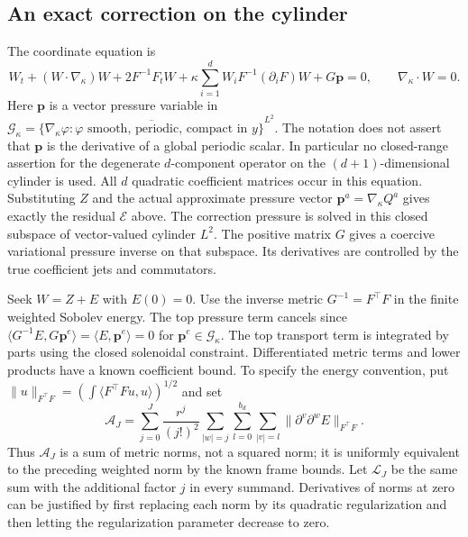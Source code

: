 \subsection{An exact correction on the cylinder}
The coordinate equation is
\begin{equation}\label{eq:packet-coordinate-equation}
 W_t+(W\cdot\nabla_\kappa)W+2F^{-1}F_tW
    +\kappa\sum_{i=1}^d W_iF^{-1}(\partial_iF)W
    +G\mathbf p=0,
 \qquad \nabla_\kappa\cdot W=0.
\end{equation}
Here $\mathbf p$ is a vector pressure variable in
$\mathscr G_\kappa=\overline{\{\nabla_\kappa\varphi:
\varphi\text{ smooth, periodic, compact in }y\}}^{L^2}$.
The notation does not assert that $\mathbf p$ is the derivative of a
global periodic scalar. In particular no closed-range assertion for the
degenerate $d$-component operator on the $(d+1)$-dimensional cylinder is
used. All $d$ quadratic coefficient matrices occur in this equation.
Substituting $Z$ and the actual approximate pressure vector
$\mathbf p^a=\nabla_\kappa Q^a$ gives exactly the residual $\mathcal E$
above. The correction pressure is solved in this closed subspace of
vector-valued cylinder $L^2$.
The positive matrix $G$ gives a coercive variational pressure inverse on
that subspace. Its derivatives are controlled by the true coefficient
jets and commutators.

Seek $W=Z+E$ with $E(0)=0$. Use the inverse metric
$G^{-1}=F^{\top}F$ in the finite weighted Sobolev energy. The top
pressure term cancels since
$\langle G^{-1}E,G\mathbf p^e\rangle
 =\langle E,\mathbf p^e\rangle=0$ for $\mathbf p^e\in\mathscr G_\kappa$.
The top transport term is integrated by parts using the closed
solenoidal constraint. Differentiated metric terms and lower products
have a known coefficient bound. To specify the energy convention, put
$\|u\|_{F^{\top}F}=(\int\langle F^{\top}Fu,u\rangle)^{1/2}$ and set
\[
 \mathcal A_J=\sum_{j=0}^J\frac{r^j}{(j!)^2}
   \sum_{|w|=j}\sum_{l=0}^{b_d}\sum_{|v|=l}
       \|\partial^v\partial^w E\|_{F^{\top}F}.
\]
Thus $\mathcal A_J$ is a sum of metric norms, not a squared norm; it is
uniformly equivalent to the preceding weighted norm by the known frame
bounds. Let $\mathcal L_J$ be the same sum with the additional factor
$j$ in every summand. Derivatives of norms at zero can be justified by
first replacing each norm by its quadratic regularization and then
letting the regularization parameter decrease to zero.

